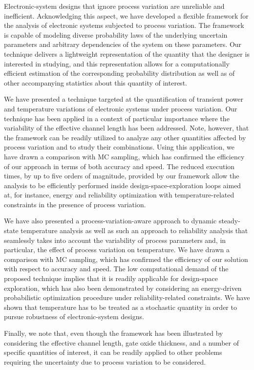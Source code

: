 Electronic-system designs that ignore process variation are unreliable and
inefficient. Acknowledging this aspect, we have developed a flexible framework
for the analysis of electronic systems subjected to process variation. The
framework is capable of modeling diverse probability laws of the underlying
uncertain parameters and arbitrary dependencies of the system on these
parameters. Our technique delivers a lightweight representation of the quantity
that the designer is interested in studying, and this representation allows for
a computationally efficient estimation of the corresponding probability
distribution as well as of other accompanying statistics about this quantity of
interest.

We have presented a technique targeted at the quantification of transient power
and temperature variations of electronic systems under process variation. Our
technique has been applied in a context of particular importance where the
variability of the effective channel length has been addressed. Note, however,
that the framework can be readily utilized to analyze any other quantities
affected by process variation and to study their combinations. Using this
application, we have drawn a comparison with \ac{MC} sampling, which has
confirmed the efficiency of our approach in terms of both accuracy and speed.
The reduced execution times, by up to five orders of magnitude, provided by our
framework allow the analysis to be efficiently performed inside
design-space-exploration loops aimed at, for instance, energy and reliability
optimization with temperature-related constraints in the presence of process
variation.

We have also presented a process-variation-aware approach to dynamic
steady-state temperature analysis as well as such an approach to reliability
analysis that seamlessly takes into account the variability of process
parameters and, in particular, the effect of process variation on temperature.
We have drawn a comparison with \ac{MC} sampling, which has confirmed the
efficiency of our solution with respect to accuracy and speed. The low
computational demand of the proposed technique implies that it is readily
applicable for design-space exploration, which has also been demonstrated by
considering an energy-driven probabilistic optimization procedure under
reliability-related constraints. We have shown that temperature has to be
treated as a stochastic quantity in order to pursue robustness of
electronic-system designs.

Finally, we note that, even though the framework has been illustrated by
considering the effective channel length, gate oxide thickness, and a number of
specific quantities of interest, it can be readily applied to other problems
requiring the uncertainty due to process variation to be considered.
